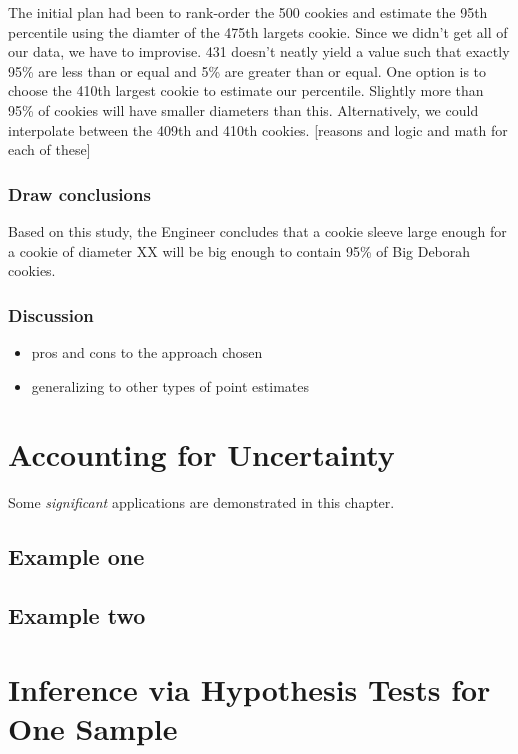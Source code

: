\documentclass[]{book}
\providecommand{\tightlist}{%
  \setlength{\itemsep}{0pt}\setlength{\parskip}{0pt}}
\theoremstyle{definition}
\theoremstyle{definition}
\theoremstyle{definition}
\theoremstyle{remark}
\begin{document}
The initial plan had been to rank-order the 500 cookies and estimate the
95th percentile using the diamter of the 475th largets cookie. Since we
didn't get all of our data, we have to improvise. 431 doesn't neatly
yield a value such that exactly 95\% are less than or equal and 5\% are
greater than or equal. One option is to choose the 410th largest cookie
to estimate our percentile. Slightly more than 95\% of cookies will have
smaller diameters than this. Alternatively, we could interpolate between
the 409th and 410th cookies. {[}reasons and logic and math for each of
these{]}

\subsection{Draw conclusions}\label{draw-conclusions-2}

Based on this study, the Engineer concludes that a cookie sleeve large
enough for a cookie of diameter XX will be big enough to contain 95\% of
Big Deborah cookies.

\subsection{Discussion}\label{discussion}

\begin{itemize}
\tightlist
\item
  pros and cons to the approach chosen
\item
  generalizing to other types of point estimates
\end{itemize}

\chapter{Accounting for Uncertainty}\label{accounting-for-uncertainty}

Some \emph{significant} applications are demonstrated in this chapter.

\section{Example one}\label{example-one}

\section{Example two}\label{example-two}

\chapter{Inference via Hypothesis Tests for One Sample}\label{HT}
\end{document}
